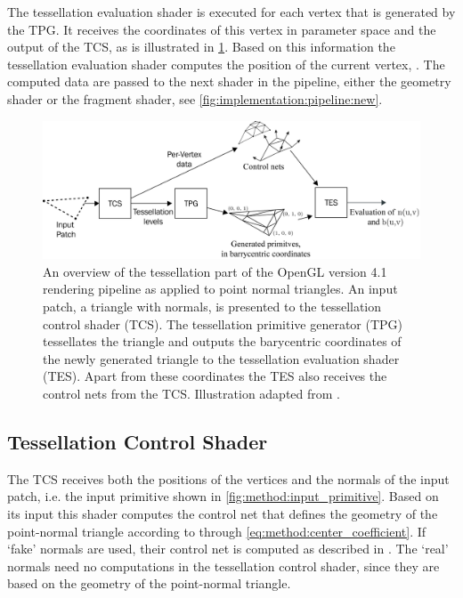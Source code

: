 	The tessellation evaluation shader is executed for each vertex that is generated by the TPG. 
	It receives the coordinates of this vertex in parameter space and the output of the TCS, as is illustrated in \cref{fig:implementation:tessellationPipeline}. 
	Based on this information the tessellation evaluation shader computes the position of the current vertex, \cite{wolff2013opengl}. 
	The computed data are passed to the next shader in the pipeline, either the geometry shader or the fragment shader, see \cref{fig:implementation:pipeline:new}.

	\begin{figure}
		\centering
		\includegraphics[width=\textwidth, height = 0.25\textheight, keepaspectratio]{content/img/implementation/tessellationPipeline-01.png}
		\caption{An overview of the tessellation part of the OpenGL version 4.1 rendering pipeline as applied to point normal triangles. An input patch, a triangle with normals, is presented to the tessellation control shader (TCS). The tessellation primitive generator (TPG) tessellates the triangle and outputs the barycentric coordinates of the newly generated triangle to the tessellation evaluation shader (TES). Apart from these coordinates the TES also receives the control nets from the TCS. Illustration adapted from \textcite{wolff2013opengl}.}
		\label{fig:implementation:tessellationPipeline}
	\end{figure}

\subsection{Tessellation Control Shader}
\label{ss:implementation:tcs}
	The TCS receives both the positions of the vertices and the normals of the input patch, i.e. the input primitive shown in \cref{fig:method:input_primitive}.
		Based on its input this shader computes the control net that defines the geometry of the point-normal triangle according to  through \ref{eq:method:center_coefficient}.
		If `fake' normals are used, their control net is computed as described in .
		The `real' normals need no computations in the tessellation control shader, since they are based on the geometry of the point-normal triangle.

